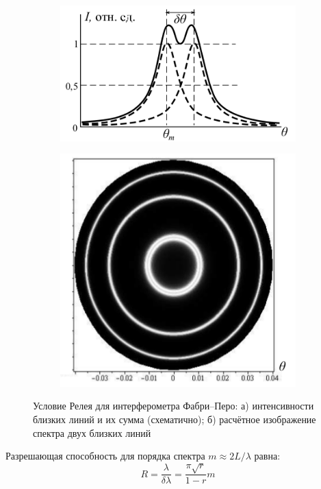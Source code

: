 \begin{enumerate}
    \begin{figure}[h!]
    \centering
    \begin{subfigure}[b]{0.45\textwidth}
        \includegraphics[width=\textwidth]{022.png}
    \end{subfigure}
    \begin{subfigure}[b]{0.45\textwidth}
        \includegraphics[width=\textwidth]{023.png}
    \end{subfigure}
    \caption{Условие Релея для интерферометра Фабри–Перо: а) интенсивности близких линий и их сумма (схематично); б) расчётное изображение спектра двух близких линий}
    \end{figure}
    \newpage
    Разрешающая способность для порядка спектра $m \approx 2L / \lambda$ равна:
    \[ R = \frac{\lambda}{\delta\lambda} = \frac{\pi\sqrt{r}}{1 - r}m \]
    
\end{enumerate}